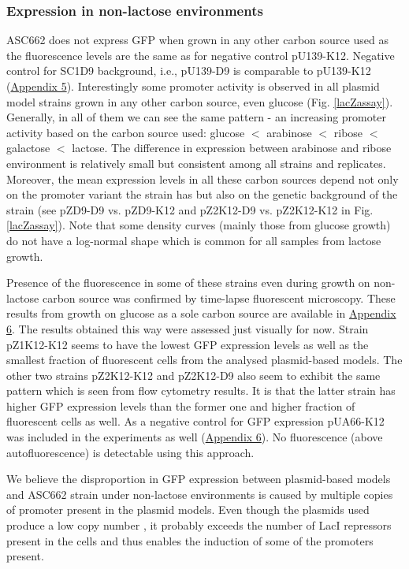 \subsubsection{Expression in non-lactose environments}
ASC662 does not express GFP when grown in any other carbon source used as the fluorescence levels are the same as for negative control pU139-K12.
Negative control for SC1\textunderscore D9 background, i.e., pU139-D9 is comparable to pU139-K12 (\hyperlink{FCnegs}{Appendix 5}).
Interestingly some  promoter activity is observed in all plasmid model strains grown in any other carbon source, even glucose (Fig. \ref{lacZassay}).
Generally, in all of them we can see the same pattern - an increasing  promoter activity based on the carbon source used: glucose $<$ arabinose $<$ ribose $<$ galactose $<$ lactose.
The difference in expression between arabinose and ribose environment is relatively small but consistent among all strains and replicates.
Moreover, the mean expression levels in all these carbon sources depend not only on the promoter variant the strain has but also on the genetic background of the strain (see pZ\textunderscore D9-D9 vs. pZ\textunderscore D9-K12 and pZ2\textunderscore K12-D9 vs. pZ2\textunderscore K12-K12 in Fig. \ref{lacZassay}).
Note that some density curves (mainly those from glucose growth) do not have a log-normal shape which is common for all samples from lactose growth.

Presence of the fluorescence in some of these strains even during growth on non-lactose carbon source was confirmed by time-lapse fluorescent microscopy.
These results from growth on glucose as a sole carbon source are available in \hyperlink{micro}{Appendix 6}.
The results obtained this way were assessed just visually for now.
Strain pZ1\textunderscore K12-K12 seems to have the lowest GFP expression levels as well as the smallest fraction of fluorescent cells from the analysed plasmid-based models.
The other two strains pZ2\textunderscore K12-K12 and pZ2\textunderscore K12-D9 also seem to exhibit the same pattern which is seen from flow cytometry results.
It is that the latter strain has higher GFP expression levels than the former one and higher fraction of fluorescent cells as well.
As a negative control for GFP expression pUA66-K12 was included in the experiments as well (\hyperlink{micro}{Appendix 6}).
No fluorescence (above autofluorescence) is detectable using this approach.

We believe the disproportion in GFP expression between plasmid-based models and ASC662 strain under non-lactose environments is caused by multiple copies of  promoter present in the plasmid models.
Even though the plasmids used produce a low copy number \cite{zaslaver2006comprehensive}, it probably exceeds the number of LacI repressors present in the cells and thus enables the induction of some of the  promoters present.

